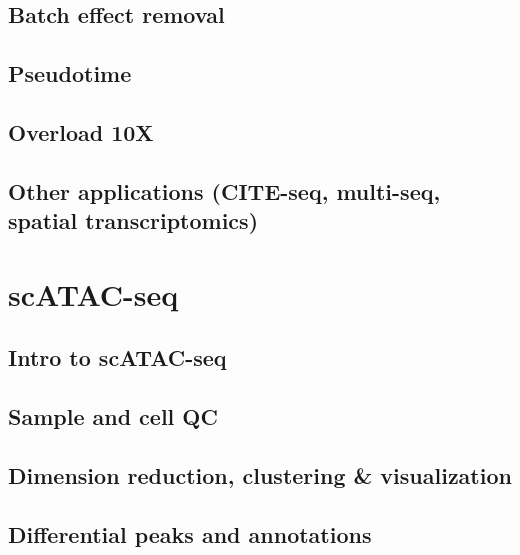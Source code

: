 \documentclass[
]{book}
\begin{document}
\hypertarget{batch-effect-removal-1}{%
\section{Batch effect removal}\label{batch-effect-removal-1}}

\hypertarget{pseudotime}{%
\section{Pseudotime}\label{pseudotime}}

\hypertarget{overload-10x}{%
\section{Overload 10X}\label{overload-10x}}

\hypertarget{other-applications-cite-seq-multi-seq-spatial-transcriptomics}{%
\section{Other applications (CITE-seq, multi-seq, spatial transcriptomics)}\label{other-applications-cite-seq-multi-seq-spatial-transcriptomics}}

\hypertarget{scatac}{%
\chapter{scATAC-seq}\label{scatac}}

\hypertarget{intro-to-scatac-seq}{%
\section{Intro to scATAC-seq}\label{intro-to-scatac-seq}}

\hypertarget{sample-and-cell-qc}{%
\section{Sample and cell QC}\label{sample-and-cell-qc}}

\hypertarget{dimension-reduction-clustering-visualization}{%
\section{Dimension reduction, clustering \& visualization}\label{dimension-reduction-clustering-visualization}}

\hypertarget{differential-peaks-and-annotations}{%
\section{Differential peaks and annotations}\label{differential-peaks-and-annotations}}
\end{document}
